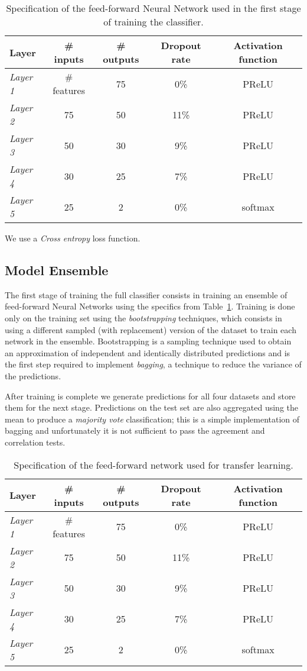 \documentclass[conference]{IEEEtran}
\begin{document}
\begin{table}
	\centering
	\begin{tabular}[H]{ l c c c c }
		\textbf{Layer} & \textbf{\# inputs} & \textbf{\# outputs} &
			\textbf{Dropout rate} & \textbf{Activation function} \\ \hline
		\textit{Layer 1} & \# features & 75 & 0\% & PReLU \\
		\textit{Layer 2} & 75 & 50 & 11\% & PReLU \\
		\textit{Layer 3} & 50 & 30 & 9\% & PReLU \\
		\textit{Layer 4} & 30 & 25 & 7\% & PReLU \\
		\textit{Layer 5} & 25 & 2 & 0\% & softmax \\
	\end{tabular}
	\caption{Specification of the feed-forward Neural Network used in the first
		stage of training the classifier.}
	\label{tab:model1}
\end{table}

We use a \textit{Cross entropy} loss function.

\subsection{Model Ensemble}
The first stage of training the full classifier consists in training an ensemble
of feed-forward Neural Networks using the specifics from Table~\ref{tab:model1}.
Training is done only on the training set using the \textit{bootstrapping}
techniques, which consists in using a different sampled (with replacement)
version of the dataset to train each network in the ensemble. Bootstrapping is a
sampling technique used to obtain an approximation of independent and
identically distributed predictions and is the first step required to implement
\textit{bagging}, a technique to reduce the variance of the predictions.

After training is complete we generate predictions for all four datasets and
store them for the next stage. Predictions on the test set are also aggregated
using the mean to produce a \textit{majority vote} classification; this is a
simple implementation of bagging and unfortunately it is not sufficient to pass
the agreement and correlation tests.

\begin{table} %
	\centering
	\begin{tabular}{ l c c c c }
		\textbf{Layer} & \textbf{\# inputs} & \textbf{\# outputs} &
			\textbf{Dropout rate} & \textbf{Activation function} \\ \hline
		\textit{Layer 1} & \# features & 75 & 0\% & PReLU \\
		\textit{Layer 2} & 75 & 50 & 11\% & PReLU \\
		\textit{Layer 3} & 50 & 30 & 9\% & PReLU \\
		\textit{Layer 4} & 30 & 25 & 7\% & PReLU \\
		\textit{Layer 5} & 25 & 2 & 0\% & softmax \\
	\end{tabular}
	\caption{Specification of the feed-forward network used for transfer
		learning.}
	\label{tab:model2}
\end{table}
\end{document}
